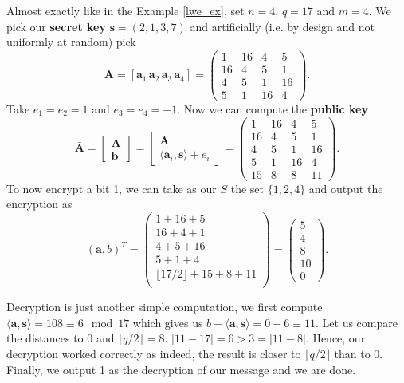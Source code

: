\begin{example}
    Almost exactly like in the Example \ref{lwe_ex}, set $n = 4$, $q=17$ and $m=4$. We pick our \textbf{secret key} $\bm{s} = (2,1,3,7)$ and artificially (i.e. by design and not uniformly at random) pick
    \[ \bm{A} = [\bm{a}_1 \, \bm{a}_2 \, \bm{a}_3 \, \bm{a}_4] = 
	\begin{pmatrix}1 & 16 & 4 & 5\\
	    		16 & 4 & 5 & 1 \\
			4 & 5 & 1 & 16 \\
			5 & 1 & 16 & 4
	\end{pmatrix}. \]
	Take $e_1 = e_2 = 1$ and $e_3 = e_4 = -1$. Now we can compute the \textbf{public key} 
	\[ \bar{\bm{A}} = \begin{bmatrix} \bm{A} \\ \bm{b} \end{bmatrix} = 
	\begin{bmatrix} \bm{A} \\ \langle \bm{a}_i, \bm{s} \rangle + e_i \end{bmatrix}  = 
	\begin{pmatrix} 1 & 16 & 4 & 5 \\
	    16 & 4 & 5 & 1 \\
	    4 & 5 & 1 & 16 \\
	    5 & 1 & 16 & 4 \\
	    15 & 8 & 8 & 11
	\end{pmatrix}.
	\]
    To now encrypt a bit 1, we can take as our $S$ the set $\{1,2,4\}$ and output the encryption as
     \[(\bm{a}, b)^T = \begin{pmatrix} 1 + 16 + 5\\ 
		16 + 4 + 1\\
		4 + 5 + 16 \\
		5 + 1 + 4 \\
		\lfloor 17/2 \rfloor + 15 + 8 + 11 \\
		\end{pmatrix} = \begin{pmatrix} 5 \\ 4 \\ 8 \\ 10 \\ 0  \end{pmatrix}.
	    \]

	    Decryption is just another simple computation, we first compute $\langle \bm{a}, \bm{s} \rangle = 108 \equiv 6 \mod 17$ which gives us $b - \langle \bm{a}, \bm{s} \rangle = 0 - 6 \equiv 11$. Let us compare the distances to 0 and $\lfloor q/2 \rfloor = 8$. $|11 - 17| = 6 > 3 = |11 - 8|$. Hence, our decryption worked correctly as indeed, the result is closer to $\lfloor q/2 \rfloor$ than to 0. Finally, we output 1 as the decryption of our message and we are done.


\end{example}

